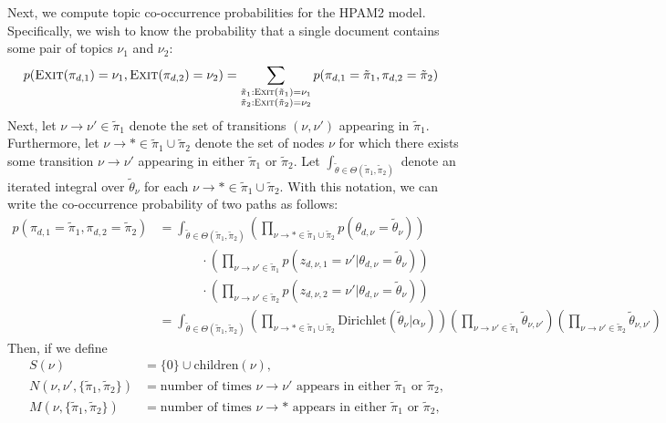 \documentclass{article}
\newcommand{\Dirichlet}{\text{Dirichlet}}
\newcommand{\Exit}{\textsc{Exit}}
\begin{document}
Next, we compute topic co-occurrence probabilities for the HPAM2 model.
Specifically, we wish to know the probability that a single document contains some pair of topics $\nu_1$ and $\nu_2$:
\begin{align}
p(\Exit(\pi_{d,1}) = \nu_1,
  \Exit(\pi_{d,2}) = \nu_2)
&=
\sum_{
  \substack{
    \tilde\pi_1 : \Exit(\tilde\pi_1) = \nu_1
    \\
    \tilde\pi_2 : \Exit(\tilde\pi_2) = \nu_2
  }
}
p(\pi_{d,1} = \tilde\pi_1, \pi_{d,2} = \tilde\pi_2)
\end{align}
Next, let $\nu \to \nu' \in \tilde\pi_1$ denote the set of transitions $(\nu, \nu')$ appearing in $\tilde\pi_1$.
Furthermore, let $\nu \to * \in \tilde\pi_1 \cup \tilde\pi_2$ denote the set of nodes $\nu$ for which there exists some transition $\nu \to \nu'$ appearing in either $\tilde\pi_1$ or $\tilde\pi_2$.
Let $\int_{\tilde\theta \in \Theta(\tilde\pi_1, \tilde\pi_2)}$ denote an iterated integral over $\tilde\theta_\nu$ for each $\nu \to * \in \tilde\pi_1 \cup \tilde\pi_2$.
With this notation, we can write the co-occurrence probability of two paths as follows:
\begin{align}
p(\pi_{d,1} = \tilde\pi_1, \pi_{d,2} = \tilde\pi_2)
&=
\int_{\tilde\theta \in \Theta(\tilde\pi_1, \tilde\pi_2)}
  \left(
    \prod_{\nu \to * \in \tilde\pi_1 \cup \tilde\pi_2}
    p(\theta_{d,\nu} = \tilde\theta_\nu)
  \right)
  \\ &\phantom{=}\qquad \cdot
  \left(
    \prod_{\nu \to \nu' \in \tilde\pi_1}
    p(z_{d,\nu,1} = \nu' | \theta_{d,\nu} = \tilde\theta_\nu)
  \right)
  \\ &\phantom{=}\qquad \cdot
  \left(
    \prod_{\nu \to \nu' \in \tilde\pi_2}
    p(z_{d,\nu,2} = \nu' | \theta_{d,\nu} = \tilde\theta_\nu)
  \right)
\\
&=
\int_{\tilde\theta \in \Theta(\tilde\pi_1, \tilde\pi_2)}
  \left(
    \prod_{\nu \to * \in \tilde\pi_1 \cup \tilde\pi_2}
    \Dirichlet(\tilde\theta_\nu | \alpha_\nu)
  \right)
  \left(
    \prod_{\nu \to \nu' \in \tilde\pi_1}
    \tilde\theta_{\nu,\nu'}
  \right)
  \left(
    \prod_{\nu \to \nu' \in \tilde\pi_2}
    \tilde\theta_{\nu,\nu'}
  \right)
\end{align}
Then, if we define
\begin{align}
S(\nu) &= \{0\} \cup \text{children}(\nu), \\
N(\nu,\nu',\{\tilde\pi_1,\tilde\pi_2\}) &= \text{number of times $\nu \to \nu'$ appears in either $\tilde\pi_1$ or $\tilde\pi_2$}, \\
M(\nu,\{\tilde\pi_1,\tilde\pi_2\}) &= \text{number of times $\nu \to *$ appears in either $\tilde\pi_1$ or $\tilde\pi_2$},
\end{align}
\end{document}
